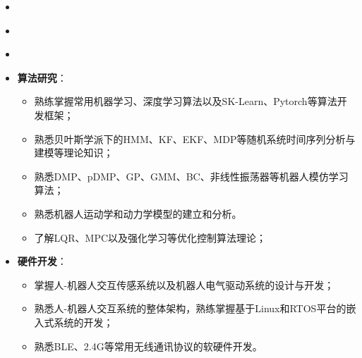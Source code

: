 \begin{itemize}[leftmargin=*]
  \item {}
\end{itemize}

\vspace{-1mm}
\begin{itemize}[leftmargin=*]
  \item {}
\end{itemize}

\vspace{-1mm}
\begin{itemize}[leftmargin=*]
  \item {}
\end{itemize}

\vspace{-1mm}
\begin{itemize}[leftmargin=*]
  \item \textbf{算法研究}：
  {\small
  \begin{itemize}
    \item 熟练掌握常用机器学习、深度学习算法以及SK-Learn、Pytorch等算法开发框架；
    \item 熟悉贝叶斯学派下的HMM、KF、EKF、MDP等随机系统时间序列分析与建模等理论知识；
    \item 熟悉DMP、pDMP、GP、GMM、BC、非线性振荡器等机器人模仿学习算法；
    \item 熟悉机器人运动学和动力学模型的建立和分析。
    \item 了解LQR、MPC以及强化学习等优化控制算法理论；
  \end{itemize}}
\end{itemize}

\vspace{-3mm}
\begin{itemize}[leftmargin=*]
  \item \textbf{硬件开发}：
  {\small
  \begin{itemize}
    \item 掌握人-机器人交互传感系统以及机器人电气驱动系统的设计与开发；
    \item 熟悉人-机器人交互系统的整体架构，熟练掌握基于Linux和RTOS平台的嵌入式系统的开发；
    \item 熟悉BLE、2.4G等常用无线通讯协议的软硬件开发。
  \end{itemize}}
\end{itemize}

